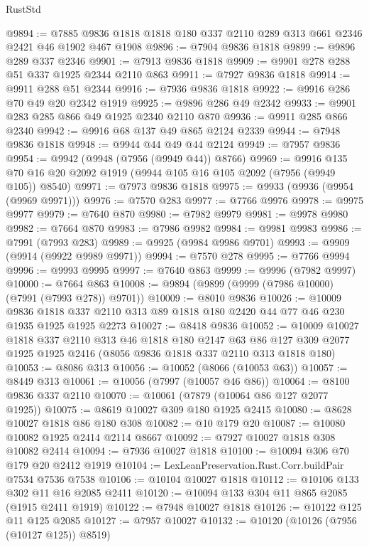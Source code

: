 \begin{lexlean}{RustStd}
\begin{coremodule}
{\begin{coremodule}
{{{{{{{{{{{{{{{{{{{{{{{{{{{{{{{{{{{{{{{{{{{@9894 := @7885 @9836 @1818 @1818 @180 @337 @2110 @289 @313 @661 @2346 @2421 @46 @1902 @467 @1908
@9896 := @7904 @9836 @1818
@9899 := @9896 @289 @337 @2346
@9901 := @7913 @9836 @1818
@9909 := @9901 @278 @288 @51 @337 @1925 @2344 @2110 @863
@9911 := @7927 @9836 @1818
@9914 := @9911 @288 @51 @2344
@9916 := @7936 @9836 @1818
@9922 := @9916 @286 @70 @49 @20 @2342 @1919
@9925 := @9896 @286 @49 @2342
@9933 := @9901 @283 @285 @866 @49 @1925 @2340 @2110 @870
@9936 := @9911 @285 @866 @2340
@9942 := @9916 @68 @137 @49 @865 @2124 @2339
@9944 := @7948 @9836 @1818
@9948 := @9944 @44 @49 @44 @2124
@9949 := @7957 @9836
@9954 := @9942 (@9948 (@7956 (@9949 @44)) @8766)
@9969 := @9916 @135 @70 @16 @20 @2092 @1919 (@9944 @105 @16 @105 @2092 (@7956 (@9949 @105)) @8540)
@9971 := @7973 @9836 @1818
@9975 := @9933 (@9936 (@9954 (@9969 @9971)))
@9976 := @7570 @283
@9977 := @7766 @9976
@9978 := @9975 @9977
@9979 := @7640 @870
@9980 := @7982 @9979
@9981 := @9978 @9980
@9982 := @7664 @870
@9983 := @7986 @9982
@9984 := @9981 @9983
@9986 := @7991 (@7993 @283)
@9989 := @9925 (@9984 @9986 @9701)
@9993 := @9909 (@9914 (@9922 @9989 @9971))
@9994 := @7570 @278
@9995 := @7766 @9994
@9996 := @9993 @9995
@9997 := @7640 @863
@9999 := @9996 (@7982 @9997)
@10000 := @7664 @863
@10008 := @9894 (@9899 (@9999 (@7986 @10000) (@7991 (@7993 @278)) @9701))
@10009 := @8010 @9836
@10026 := @10009
    @9836
    @1818
    @337
    @2110
    @313
    @89
    @1818
    @180
    @2420
    @44
    @77
    @46
    @230
    @1935
    @1925
    @1925
    @2273
@10027 := @8418 @9836
@10052 := @10009
    @10027
    @1818
    @337
    @2110
    @313
    @46
    @1818
    @180
    @2147
    @63
    @86
    @127
    @309
    @2077
    @1925
    @1925
    @2416
    (@8056 @9836 @1818 @337 @2110 @313 @1818 @180)
@10053 := @8086 @313
@10056 := @10052 (@8066 (@10053 @63))
@10057 := @8449 @313
@10061 := @10056 (@7997 (@10057 @46 @86))
@10064 := @8100 @9836 @337 @2110
@10070 := @10061 (@7879 (@10064 @86 @127 @2077 @1925))
@10075 := @8619 @10027 @309 @180 @1925 @2415
@10080 := @8628 @10027 @1818 @86 @180 @308
@10082 := @10 @179 @20
@10087 := @10080 @10082 @1925 @2414 @2114 @8667
@10092 := @7927 @10027 @1818 @308 @10082 @2414
@10094 := @7936 @10027 @1818
@10100 := @10094 @306 @70 @179 @20 @2412 @1919
@10104 := LexLeanPreservation.Rust.Corr.buildPair @7534 @7536 @7538
@10106 := @10104 @10027 @1818
@10112 := @10106 @133 @302 @11 @16 @2085 @2411
@10120 := @10094 @133 @304 @11 @865 @2085 (@1915 @2411 @1919)
@10122 := @7948 @10027 @1818
@10126 := @10122 @125 @11 @125 @2085
@10127 := @7957 @10027
@10132 := @10120 (@10126 (@7956 (@10127 @125)) @8519)
}}}}}}}}}}}}}}}}}}}}}}}}}}}}}}}}}}}}}}}}}}}
\end{coremodule}}
\end{coremodule}
\end{lexlean}
